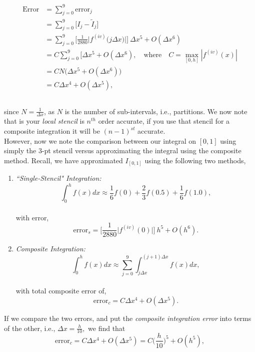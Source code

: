 \documentclass[paper=a4, fontsize=11pt]{scrartcl} %
\numberwithin{equation}{section} %
\numberwithin{figure}{section} %
\numberwithin{table}{section} %
\begin{document}
 \begin{align}
 \nonumber
 \begin{split}
 \mbox{Error} &= \sum_{j=0}^{9} \mbox{error}_j \\ 
 		      &=  \sum_{j=0}^{9} \Big[I_j - \tilde{I}_j \Big] \\ 
 		      &= \sum_{j=0}^{9} \Bigg[\frac{1}{2880} \big|f^{(iv)}\big (j\Delta x\big)\big| \Bigg]\ \Delta x^5 + O(\Delta x^6) \\ 
		      &=C \sum_{j=0}^{9} \Bigg[ \Delta x^5 + O(\Delta x^6), \ \ \ \mbox{ where } \ \ \ C = \displaystyle \max_{[0,h]} |f^{(iv)}(x)|\\
		      &=C N \bigg( \Delta x^5 + O(\Delta x^6) \bigg) \\
		      &= C \Delta x^4 + O(\Delta x^5), \\
 \end{split}
 \end{align}\\
 
 since $N=\frac{1}{\Delta x}$, as $N$ is the number of sub-intervals, i.e., partitions.  We now note that is your \emph{local stencil} is $n^{th}$ order accurate, if you use that stencil for a composite integration it will be $(n-1)^{st}$ accurate.\\
 
 However, now we note the comparison between our integral on $[0,1]$ using simply the $3$-pt stencil versus approximating the integral using the composite method. Recall, we have approximated $I_{[0,1]}$ using the following two methods,
 
 \begin{enumerate}
 \item \emph{``Single-Stencil" Integration:} $$\int_0^h f(x) dx \approx  \frac{1}{6} f(0) + \frac{2}{3}  f(0.5) + \frac{1}{6} f(1.0),$$ \\
 with error, $$\mbox{error}_{s} = \Bigg[\frac{1}{2880} \big|f^{(iv)}(0)\big| \Bigg]\ h^5 + O(h^6).$$
 \item \emph{Composite Integration:} $$\int_0^h f(x) dx \approx \sum_{j=0}^9 \int_{j\Delta x}^{(j+1)\Delta x} f(x) dx,$$\\
 with total composite error of, $$\mbox{error}_{c} = C \Delta x^4 + O(\Delta x^5).$$
 \end{enumerate}
 
 If we compare the two errors, and put the \emph{composite integration error} into terms of the other, i.e., $\Delta x = \frac{h}{10},$ we find that 
 $$\mbox{error}_c = C \Delta x^4 + O(\Delta x^5) = C\Bigg( \frac{h}{10} \Bigg)^5 + O(h^5),$$\\
 
\end{document}

